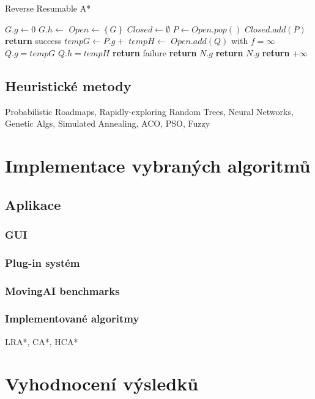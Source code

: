 \begin{algorithm}[H]
	\caption{Reverse Resumable A*}
	\label{alg:RRA}
	\begin{algorithmic}[1]
			\State $G.g\gets 0$
			\State $G.h\gets$ 
			\State $Open\gets\left\{ G \right\}$
			\State $Closed\gets\emptyset$
			\State {}
		\EndFunction
		\Statex
				\State $P\gets Open.pop()$
				\State $Closed.add(P)$
					\State \textbf{return} success
				\EndIf
					\State $tempG\gets P.g+$ 
					\State $tempH\gets$ 
						\State $Open.add(Q)$ with $f=\infty$
					\EndIf
						\State $Q.g=tempG$
						\State $Q.h=tempH$
					\EndIf
				\EndFor
			\EndWhile
			\State \textbf{return} failure
		\EndFunction
		\Statex
				\State \textbf{return} $N.g$
			\EndIf
				\State \textbf{return} $N.g$
			\EndIf
			\State \textbf{return} $+\infty$
		\EndFunction
	\end{algorithmic}
\end{algorithm}
 
\section{Heuristické metody}
Probabilistic Roadmaps, Rapidly-exploring Random Trees, Neural Networks, Genetic Algs, Simulated Annealing, ACO, PSO, Fuzzy

\chapter{Implementace vybraných algoritmů}
\section{Aplikace}
\subsection{GUI}
\subsection{Plug-in systém}
\subsection{MovingAI benchmarks}
\subsection{Implementované algoritmy}
LRA*, CA*, HCA*

\chapter{Vyhodnocení výsledků}

\clearpage
